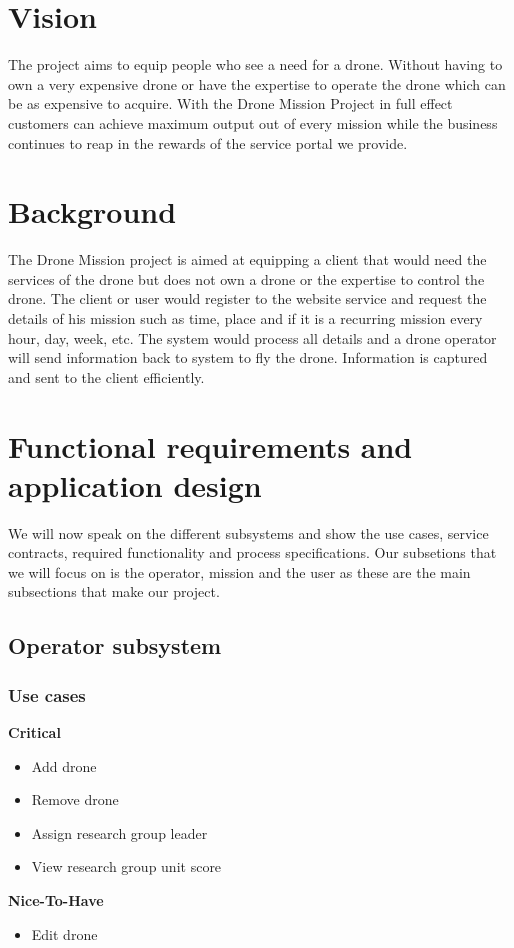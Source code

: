 \documentclass{article}
\begin{document}
\section{Vision}
	The project aims to equip people who see a need for a drone. Without having to own a very expensive drone or have the expertise to operate the drone which can be as expensive to acquire. With the Drone Mission Project in full effect customers can achieve maximum output out of every mission while the business continues to reap in the rewards of the service portal we provide.

\section{Background}
	The Drone Mission project is aimed at equipping a client that would need the services of the drone but does not own a drone or the expertise to control the drone. The client or user would register to the website service and request the details of his mission such as time, place and if it is a recurring mission every hour, day, week, etc. The system would process all details and a drone operator will send information back to system to fly the drone. Information is captured and sent to the client efficiently.

\section{Functional requirements and application design}
We will now speak on the different subsystems and show the use cases, service contracts, required functionality and process specifications. Our subsetions that we will focus on is the operator, mission and the user as these are the main subsections that make our project.

\subsection{Operator subsystem}
	\subsubsection{Use cases}

		\begin{flushleft}
			\textbf{Critical}
				\begin{itemize}
	  				\item Add drone
	  				\item Remove drone
					\item Assign research group leader
					\item View research group unit score
				\end{itemize}

			\textbf{Nice-To-Have}
				\begin{itemize}
	  				\item Edit drone
				\end{itemize}
		\end{flushleft}
\end{document}
